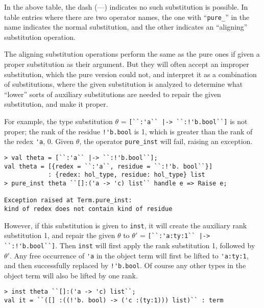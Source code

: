 In the above table, the dash (---) indicates no such substitution is
possible.  In table entries where there are two operator names, the one with
``\texttt{pure\_}'' in the name indicates the normal substitution, and
the other
indicates an ``aligning'' substitution operation.

The aligning substitution operations perform the same as the pure ones
if given a proper substitution as their argument.  But they will often
accept an improper substitution, which the pure version could not,
and interpret it as a combination of substitutions, where
the given substitution is
analyzed
to determine what ``lower'' sorts of auxiliary
substitutions are needed to repair the given substitution, and make it proper.

For example, the type substitution $\theta$ = \verb+[``:'a`` |-> ``:!'b.bool``]+
is not proper; the rank of the residue \verb+!'b.bool+ is 1,
which is greater than the rank of the redex \verb|'a|, 0.
Given $\theta$,
the operator \texttt{pure\_inst} will fail, raising an exception.
%
\begin{session}
\begin{verbatim}
> val theta = [``:'a`` |-> ``:!'b.bool``];
val theta = [{redex = ``:'a``, residue = ``:!'b. bool``}]
            : {redex: hol_type, residue: hol_type} list
> pure_inst theta ``[]:('a -> 'c) list`` handle e => Raise e;

Exception raised at Term.pure_inst:
kind of redex does not contain kind of residue
\end{verbatim}
\end{session}
%

However, if this substitution is given to \texttt{inst}, 
it will create the auxiliary rank substitution 1, and repair the given
$\theta$ to $\theta'$ = \verb+[``:'a:ty:1`` |-> ``:!'b.bool``]+.
Then \texttt{inst} will first apply the rank substitution 1,
followed by $\theta'$.  Any free occurrence of \verb|'a| in the object term
will first be lifted to \verb|'a:ty:1|, and then successfully replaced by
\verb+!'b.bool+.  Of course any other types in the object term
will also be lifted by one rank.
%
\begin{session}
\begin{verbatim}
> inst theta ``[]:('a -> 'c) list``;
val it = ``([] :((!'b. bool) -> ('c :(ty:1))) list)`` : term
\end{verbatim}
\end{session}


